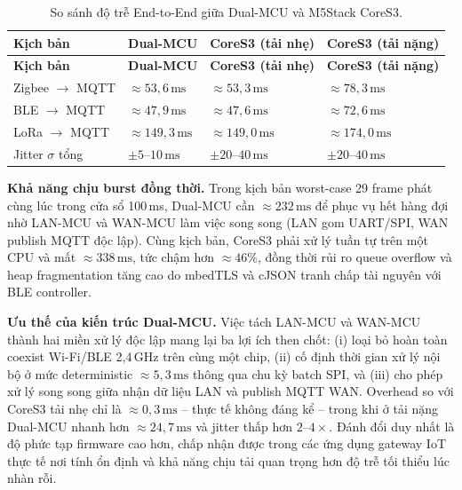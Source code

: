         \begin{longtable}{|p{4.2cm}|p{2.7cm}|p{3cm}|p{3cm}|}
            \caption{So sánh độ trễ End-to-End giữa Dual-MCU và M5Stack CoreS3.} \label{tab:e2e_compare} \\
            \hline
            \textbf{Kịch bản} & \textbf{Dual-MCU} & \textbf{CoreS3 (tải nhẹ)} & \textbf{CoreS3 (tải nặng)} \\ \hline
            \endfirsthead
            \hline
            \textbf{Kịch bản} & \textbf{Dual-MCU} & \textbf{CoreS3 (tải nhẹ)} & \textbf{CoreS3 (tải nặng)} \\ \hline
            \endhead
            \hline
            \endfoot
            \endlastfoot
            Zigbee $\rightarrow$ MQTT & $\approx 53{,}6\,\text{ms}$ & $\approx 53{,}3\,\text{ms}$ & $\approx 78{,}3\,\text{ms}$ \\ \hline
            BLE $\rightarrow$ MQTT & $\approx 47{,}9\,\text{ms}$ & $\approx 47{,}6\,\text{ms}$ & $\approx 72{,}6\,\text{ms}$ \\ \hline
            LoRa $\rightarrow$ MQTT & $\approx 149{,}3\,\text{ms}$ & $\approx 149{,}0\,\text{ms}$ & $\approx 174{,}0\,\text{ms}$ \\ \hline
            Jitter $\sigma$ tổng & $\pm 5$--$10\,\text{ms}$ & $\pm 20$--$40\,\text{ms}$ & $\pm 20$--$40\,\text{ms}$ \\ \hline
        \end{longtable}
        
        \textbf{Khả năng chịu burst đồng thời.} Trong kịch bản worst-case 29 frame phát cùng lúc trong cửa sổ 100\,ms, Dual-MCU cần $\approx 232\,\text{ms}$ để phục vụ hết hàng đợi nhờ LAN-MCU và WAN-MCU làm việc song song (LAN gom UART/SPI, WAN publish MQTT độc lập). Cùng kịch bản, CoreS3 phải xử lý tuần tự trên một CPU và mất $\approx 338\,\text{ms}$, tức chậm hơn $\approx 46\%$, đồng thời rủi ro queue overflow và heap fragmentation tăng cao do mbedTLS và cJSON tranh chấp tài nguyên với BLE controller.
        
        \textbf{Ưu thế của kiến trúc Dual-MCU.} Việc tách LAN-MCU và WAN-MCU thành hai miền xử lý độc lập mang lại ba lợi ích then chốt: (i) loại bỏ hoàn toàn coexist Wi-Fi/BLE 2,4\,GHz trên cùng một chip, (ii) cố định thời gian xử lý nội bộ ở mức deterministic $\approx 5{,}3\,\text{ms}$ thông qua chu kỳ batch SPI, và (iii) cho phép xử lý song song giữa nhận dữ liệu LAN và publish MQTT WAN. Overhead so với CoreS3 tải nhẹ chỉ là $\approx 0{,}3\,\text{ms}$ -- thực tế không đáng kể -- trong khi ở tải nặng Dual-MCU nhanh hơn $\approx 24{,}7\,\text{ms}$ và jitter thấp hơn $2$--$4\times$. Đánh đổi duy nhất là độ phức tạp firmware cao hơn, chấp nhận được trong các ứng dụng gateway IoT thực tế nơi tính ổn định và khả năng chịu tải quan trọng hơn độ trễ tối thiểu lúc nhàn rỗi.
        

